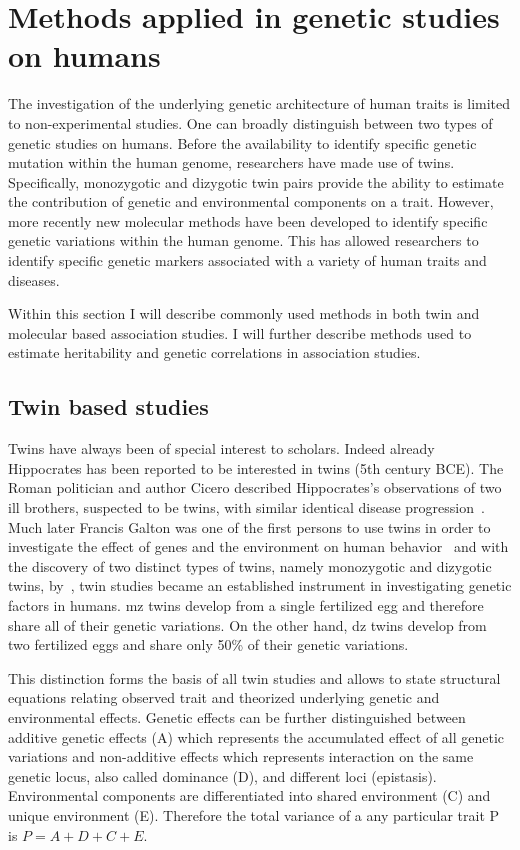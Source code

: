\section{Methods applied in genetic studies on humans}
\label{sec:methods_applied_in_genetic_studies_on_humans}

The investigation of the underlying genetic architecture of human traits is limited to non-experimental studies.
One can broadly distinguish between two types of genetic studies on humans.
Before the availability to identify specific genetic mutation within the human genome, researchers have made use of twins.
Specifically, monozygotic and dizygotic twin pairs provide the ability to estimate the contribution of genetic and environmental components on a trait.
However, more recently new molecular methods have been developed to identify specific genetic variations within the human genome.
This has allowed researchers to identify specific genetic markers associated with a variety of human traits and diseases.

Within this section I will describe commonly used methods in both twin and molecular based association studies.
I will further describe methods used to estimate heritability and genetic correlations in association studies.

\subsection{Twin based studies}
\label{sub:twin_based_studies}

Twins have always been of special interest to scholars.
Indeed already Hippocrates has been reported to be interested in twins (5th century BCE).
The Roman politician and author Cicero described Hippocrates's observations of two ill brothers, suspected to be twins, with similar identical disease progression~\cite{Cicero44BC}.
Much later Francis Galton was one of the first persons to use twins in order to investigate the effect of genes and the environment on human behavior~\cite{Rende1990} and with the discovery of two distinct types of twins, namely monozygotic and dizygotic twins, by~\citet{Simens1924}, twin studies became an established instrument in investigating genetic factors in humans.
\acrfull{mz} twins develop from a single fertilized egg and therefore share all of their genetic variations.
On the other hand, \acrfull{dz} twins develop from two fertilized eggs and share only 50\% of their genetic variations.

This distinction forms the basis of all twin studies and allows to state structural equations relating observed trait and theorized underlying genetic and environmental effects.
Genetic effects can be further distinguished between additive genetic effects (A) which represents the accumulated effect of all genetic variations and non-additive effects which represents interaction on the same genetic locus, also called dominance (D), and different loci (epistasis).
Environmental components are differentiated into shared environment (C) and unique environment (E).
Therefore the total variance of a any particular trait P is $P = A+D+C+E$.

